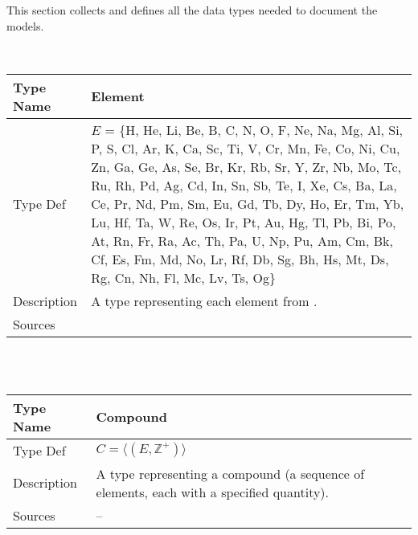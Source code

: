 \documentclass[12pt]{article}
\newcommand{\colAwidth}{0.13\textwidth}
\newcommand{\colBwidth}{0.82\textwidth}
\begin{document}
This section collects and defines all the data types needed to document the
models.

~\newline

\noindent
\begin{minipage}{\textwidth}
  \renewcommand*{\arraystretch}{1.5}
  \begin{tabular}{| p{\colAwidth} | p{\colBwidth}|}
    \hline
    \rowcolor[gray]{0.9}
    Type Name   & Element                                                   \\
    \hline
    Type Def    & $E$ = \{H, He, Li, Be, B, C, N, O, F, Ne, Na, Mg, Al, Si,
    P, S, Cl, Ar, K, Ca, Sc, Ti, V, Cr, Mn, Fe, Co, Ni, Cu, Zn, Ga, Ge, As, Se,
    Br, Kr, Rb, Sr, Y, Zr, Nb, Mo, Tc, Ru, Rh, Pd, Ag, Cd, In, Sn, Sb, Te, I,
    Xe, Cs, Ba, La, Ce, Pr, Nd, Pm, Sm, Eu, Gd, Tb, Dy, Ho, Er, Tm, Yb, Lu, Hf,
    Ta, W, Re, Os, Ir, Pt, Au, Hg, Tl, Pb, Bi, Po, At, Rn, Fr, Ra, Ac, Th, Pa,
    U, Np, Pu, Am, Cm, Bk, Cf, Es, Fm, Md, No, Lr, Rf, Db, Sg, Bh, Hs, Mt, Ds,
    Rg, Cn, Nh, Fl, Mc, Lv, Ts, Og\}                                        \\

    \hline
    Description & A type representing each element from
    \cite{wikipedia_list_2023}.                                             \\
    \hline
    Sources     & \cite{smith_assignment_2020}                              \\
    \hline
  \end{tabular}
\end{minipage}\\
~\newline

\noindent
\begin{minipage}{\textwidth}
  \renewcommand*{\arraystretch}{1.5}
  \begin{tabular}{| p{\colAwidth} | p{\colBwidth}|}
    \hline
    \rowcolor[gray]{0.9}
    Type Name   & Compound                                                     \\
    \hline
    Type Def    & $C = \langle (E, \mathbb{Z}^+) \rangle$                      \\

    \hline
    Description & A type representing a compound (a sequence of elements, each
    with a specified quantity).                                                \\
    \hline
    Sources     & --                                                           \\
    \hline
  \end{tabular}
\end{minipage}\\
\end{document}
